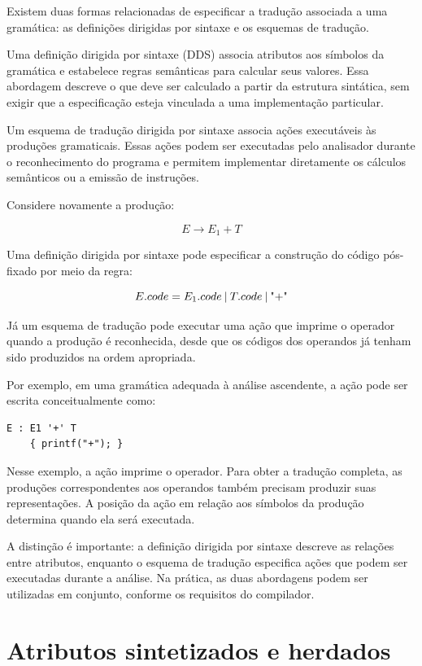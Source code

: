 \documentclass[
  brazilian,
  letterpaper,
]{book}
\theoremstyle{plain}
\theoremstyle{definition}
\theoremstyle{remark}
\begin{document}
Existem duas formas relacionadas de especificar a tradução associada a
uma gramática: as definições dirigidas por sintaxe e os esquemas de
tradução.

Uma definição dirigida por sintaxe (DDS) associa atributos aos símbolos
da gramática e estabelece regras semânticas para calcular seus valores.
Essa abordagem descreve o que deve ser calculado a partir da estrutura
sintática, sem exigir que a especificação esteja vinculada a uma
implementação particular.

Um esquema de tradução dirigida por sintaxe associa ações executáveis às
produções gramaticais. Essas ações podem ser executadas pelo analisador
durante o reconhecimento do programa e permitem implementar diretamente
os cálculos semânticos ou a emissão de instruções.

Considere novamente a produção:

\[ E \rightarrow E_1 + T \]

Uma definição dirigida por sintaxe pode especificar a construção do
código pós-fixado por meio da regra:

\[ E.code = E_1.code \mathbin{\\|} T.code \mathbin{\\|} \text{"+"} \]

Já um esquema de tradução pode executar uma ação que imprime o operador
quando a produção é reconhecida, desde que os códigos dos operandos já
tenham sido produzidos na ordem apropriada.

Por exemplo, em uma gramática adequada à análise ascendente, a ação pode
ser escrita conceitualmente como:

\begin{verbatim}
E : E1 '+' T
    { printf("+"); }
\end{verbatim}

Nesse exemplo, a ação imprime o operador. Para obter a tradução
completa, as produções correspondentes aos operandos também precisam
produzir suas representações. A posição da ação em relação aos símbolos
da produção determina quando ela será executada.

A distinção é importante: a definição dirigida por sintaxe descreve as
relações entre atributos, enquanto o esquema de tradução especifica
ações que podem ser executadas durante a análise. Na prática, as duas
abordagens podem ser utilizadas em conjunto, conforme os requisitos do
compilador.

\section{Atributos sintetizados e
herdados}\label{atributos-sintetizados-e-herdados}
\end{document}
